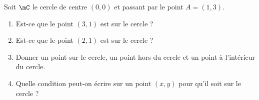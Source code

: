 
\begin{exercice}\label{exoSeconde-0079}

Soit \( \mC\) le cercle de centre \( (0,0)\) et passant par le point \( A=(1,3)\).
\begin{multicols}{2}
    \begin{enumerate}
        \item
            Est-ce que le point \( (3,1)\) est sur le cercle ?
        \item
            Est-ce que le point \( (2,1)\) est sur le cercle ?
        \item
            Donner un point sur le cercle, un point hors du cercle et un point à l'intérieur du cercle.
        \item
            Quelle condition peut-on écrire sur un point \( (x,y)\) pour qu'il soit sur le cercle ?
    \end{enumerate}
\end{multicols}

\end{exercice}
